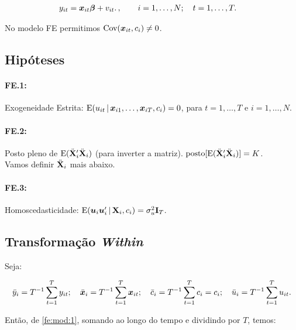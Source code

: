\documentclass[11pt, oneside, a4paper, article]{article}
\numberwithin{equation}{section}
\begin{document}
\vspace{-1 em}
\begin{align}\label{fe:mod:2}
	y_{it} &= \boldsymbol{x}_{it} \boldsymbol{\beta} + v_{it}.
	\, , \qquad	i = 1, \dots, N; \quad t = 1, \dots, T.
\end{align}

\noindent
No modelo FE permitimos $\text{Cov}(\boldsymbol{x}_{it}, c_{i} ) \neq 0$.

\subsection{Hipóteses}

\paragraph{FE.1:} Exogeneidade Estrita:
$\text{E}( u _{it} \, | \, \boldsymbol{x}_{i1}, \dots, \boldsymbol{x}_{iT}, c_{i}) = 0$, para $t=1, \dots, T$ e $i = 1, \dots, N$.

\paragraph{FE.2:} Posto pleno de $\text{E}( \ddot{\mathbf{X}}_{i}' \ddot{\mathbf{X}}_{i} )$ (para inverter a matriz).
$\text{posto}[ \text{E}( \ddot{\mathbf{X}}_{i}'  \ddot{\mathbf{X}}_{i} ) ]  = K$.
\\
Vamos definir $\ddot{\mathbf{X}}_{i}$ mais abaixo.

\paragraph{FE.3:} Homoscedasticidade:
$\text{E}( \boldsymbol{u}_{i} \boldsymbol{u}_{i}' \,|\, \mathbf{X}_{i}, c_{i}) = \sigma_{u}^{2} \mathbf{I}_{T}$.


\subsection{Transformação \textit{Within}}

Seja:

\vspace{-1 em}
\begin{align*}
	\bar{y}_{i} = T^{-1} \sum_{t=1}^{T} y_{it};
	\quad
	\bar{\boldsymbol{x}}_{i} = T^{-1} \sum_{t=1}^{T} \boldsymbol{x}_{it};
	\quad
	\bar{c}_{i} = T^{-1} \sum_{t=1}^{T} c_{i} = c_{i};
	\quad
	\bar{u}_{i} = T^{-1} \sum_{t=1}^{T} u_{it}.
\end{align*}

Então, de \eqref{fe:mod:1}, somando ao longo do tempo e dividindo por $T$, temos:
\end{document}

